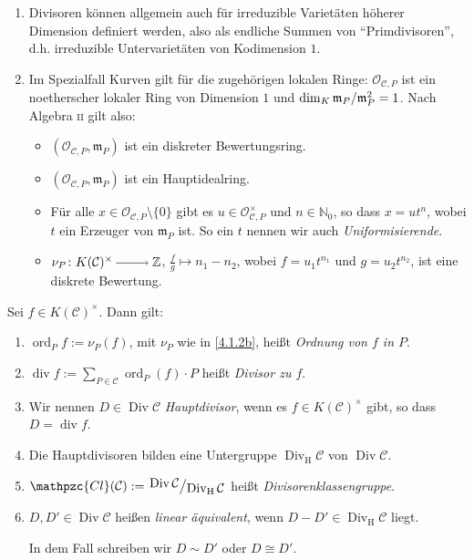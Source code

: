\documentclass[a4paper,12pt,index=toc]{scrbook}
\theoremstyle{keinenummern} %
\def\CC{\mathcal{C}}
\def\O{\mathcal{O}}
\newcommand{\Cl}{\mathpzc{Cl}}
\def\m{\mathfrak{m}}
\newcommand{\Div}{\operatorname{Div}}
\newcommand{\Divh}{\Div_{\mathrm{H}}}
\renewcommand{\div}{\operatorname{div}}
\newcommand{\ord}{\operatorname{ord}}
\newcommand{\set}[1]{\ensuremath{\mathbb{#1}}}
\newcommand{\N}{\set{N}}
\newcommand{\Z}{\set{Z}}
\begin{document}
\begin{bem}\label{4.1.2}
\begin{enumerate}
\item{} Divisoren können allgemein auch für irreduzible Varietäten höherer Dimension definiert werden, also als endliche Summen von \enquote{Primdivisoren}, d.h. irreduzible Untervarietäten von Kodimension $1$.
\item{} Im Spezialfall Kurven gilt für die zugehörigen  lokalen Ringe: $\O_{\CC,P}$ ist ein noetherscher lokaler Ring von Dimension $1$ und $\dim_{K}\Quotient{\m_{P}}{\m_{P}^{2}}=1$. Nach Algebra {\scshape ii} gilt also:
\begin{itemize}
\item $(\O_{\CC,P},\m_{P})$ ist ein diskreter Bewertungsring.
\item $(\O_{\CC,P},\m_{P})$ ist ein Hauptidealring.
\item Für alle $x\in\O_{\CC,P}\setminus\{0\}$ gibt es $u\in\O_{\CC,P}^{\times}$ und $n\in\N_{0}$, so dass $x=ut^{n}$, wobei $t$ ein Erzeuger von $\m_{P}$ ist. So ein $t$ nennen wir auch \emph{Uniformisierende}.
\item $\nu_{P}\colon K(\CC)^{\times}\ra\Z$, $\frac{f}{g}\mapsto n_{1}-n_{2}$, wobei $f=u_{1}t^{n_{1}}$ und $g=u_{2}t^{n_{2}}$, ist eine diskrete Bewertung.
\end{itemize}\end{enumerate}\end{bem}

\begin{db}\label{4.1.3}
Sei $f\in K(\CC)^{\times}$. Dann gilt:
\begin{enumerate}
\item{} $\ord_{P}f:=\nu_{P}(f)$, mit $\nu_{P}$ wie in \cref{4.1.2b}, heißt \emph{Ordnung von $f$ in $P$}.
\item{} $\displaystyle\div f:=\sum_{P\in\CC}\ord_{P}(f)\cdot P$ heißt \emph{Divisor zu $f$}.
\item{} Wir nennen $D\in\Div\CC$ \emph{Hauptdivisor}, wenn es $f\in K(\CC)^{\times}$ gibt, so dass $D=\div f$.
\item{} Die Hauptdivisoren bilden eine Untergruppe $\Divh\CC$ von $\Div\CC$.
\item{} $\displaystyle\Cl(\CC):=\Quotient{\Div\CC}{\Divh\CC}$ heißt \emph{Divisorenklassengruppe}.
\item{} $D,D'\in\Div\CC$ heißen \emph{linear äquivalent}, wenn $D-D'\in\Divh\CC$ liegt.

In dem Fall schreiben wir $D\sim D'$ oder $D\cong D'$.
\end{enumerate}\end{db}
\end{document}
